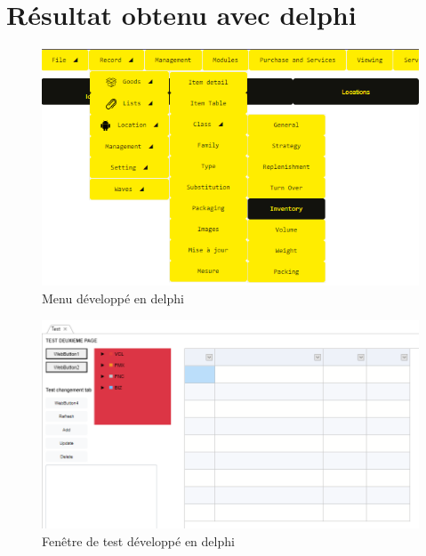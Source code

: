 \documentclass[a4paper, 12pt, french]{article}
\begin{document}
		\newpage
		\section{Résultat obtenu avec \gls{delphi}}\label{appendix:delphi_result}
			\begin{figure}[ht!]
				\begin{center}
					\includegraphics[width=0.8\linewidth]{images/delphi_menu.png}
				\end{center}
				\caption{Menu développé en \gls{delphi}}
				\label{fig:delphi_menu}
			\end{figure}
	
			\begin{figure}[ht!]
				\begin{center}
					\includegraphics[width=0.8\linewidth]{images/delphi_app.png}
				\end{center}
				\caption{Fenêtre de test développé en \gls{delphi}}
				\label{fig:delphi_app}
			\end{figure}
		
		\newpage
		
\end{document}
